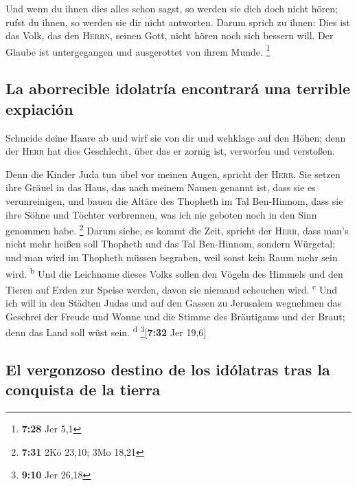  Und wenn du ihnen dies alles schon sagst, so werden sie
dich doch nicht hören; rufst du ihnen, so werden sie dir nicht
antworten.  Darum sprich zu ihnen: Dies ist das Volk, das
den \textsc{Herrn}, seinen Gott, nicht hören noch sich bessern will. Der
Glaube ist untergegangen und ausgerottet von ihrem Munde. \footnote{\textbf{7:28}
  Jer 5,1}

\hypertarget{la-aborrecible-idolatruxeda-encontraruxe1-una-terrible-expiaciuxf3n}{%
\subsection{La aborrecible idolatría encontrará una terrible
expiación}\label{la-aborrecible-idolatruxeda-encontraruxe1-una-terrible-expiaciuxf3n}}

 Schneide deine Haare ab und wirf sie von dir und
wehklage auf den Höhen; denn der \textsc{Herr} hat dies Geschlecht, über
das er zornig ist, verworfen und verstoßen.

 Denn die Kinder Juda tun übel vor meinen Augen, spricht
der \textsc{Herr}. Sie setzen ihre Gräuel in das Haus, das nach meinem
Namen genannt ist, dass sie es verunreinigen,  und bauen
die Altäre des Thopheth im Tal Ben-Hinnom, dass sie ihre Söhne und
Töchter verbrennen, was ich nie geboten noch in den Sinn genommen habe.
\footnote{\textbf{7:31} 2Kö 23,10; 3Mo 18,21}  Darum
siehe, es kommt die Zeit, spricht der \textsc{Herr}, dass man's nicht
mehr heißen soll Thopheth und das Tal Ben-Hinnom, sondern Würgetal; und
man wird im Thopheth müssen begraben, weil sonst kein Raum mehr sein
wird. \textsuperscript{b}  Und die Leichname dieses Volks
sollen den Vögeln des Himmels und den Tieren auf Erden zur Speise
werden, davon sie niemand scheuchen wird. \textsuperscript{c}
 Und ich will in den Städten Judas und auf den Gassen zu
Jerusalem wegnehmen das Geschrei der Freude und Wonne und die Stimme des
Bräutigams und der Braut; denn das Land soll wüst sein.
\textsuperscript{d} \footnote{\textbf{9:10} Jer 26,18}{[}\textbf{7:32}
Jer 19,6{]}

\hypertarget{el-vergonzoso-destino-de-los-iduxf3latras-tras-la-conquista-de-la-tierra}{%
\subsection{El vergonzoso destino de los idólatras tras la conquista de
la
tierra}\label{el-vergonzoso-destino-de-los-iduxf3latras-tras-la-conquista-de-la-tierra}}

